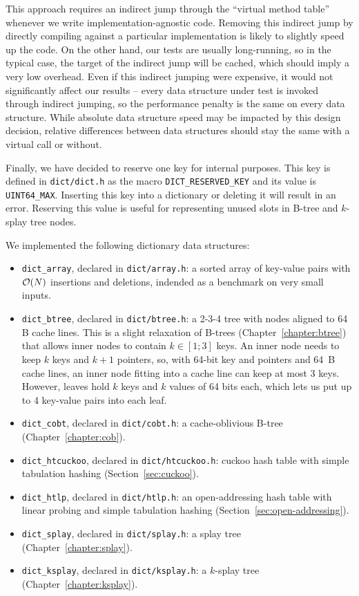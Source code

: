 This approach requires an indirect jump through the ``virtual method table''
whenever we write implementation-agnostic code. Removing this indirect jump
by directly compiling against a particular implementation is likely to slightly
speed up the code. On the other hand, our tests are usually long-running, so in
the typical case, the target of the indirect jump will be cached, which should
imply a very low overhead. Even if this indirect jumping were expensive, it
would not significantly affect our results -- every data structure under test
is invoked through indirect jumping, so the performance penalty is the same
on every data structure. While absolute data structure speed may be impacted
by this design decision, relative differences between data structures should
stay the same with a virtual call or without.

Finally, we have decided to reserve one key for internal purposes.
This key is defined in \texttt{dict/dict.h} as the macro
\texttt{DICT\_RESERVED\_KEY} and its value is \texttt{UINT64\_MAX}.
Inserting this key into a dictionary or deleting it will result in an error.
Reserving this value is useful for representing unused slots in B-tree
and $k$-splay tree nodes.

We implemented the following dictionary data structures:
\begin{itemize}
\item \texttt{dict\_array}, declared in \texttt{dict/array.h}:
	a sorted array of key-value pairs with $\mathcal{O}(N)$ insertions and deletions,
	indended as a benchmark on very small inputs.
\item \texttt{dict\_btree}, declared in \texttt{dict/btree.h}:
	a 2-3-4 tree with nodes aligned to 64 B cache lines.
	This is a slight relaxation of B-trees (Chapter~\ref{chapter:btree})
	that allows inner nodes to contain $k\in[1;3]$ keys.
	An inner node needs to keep $k$ keys and $k+1$ pointers, so, with
	64-bit key and pointers and 64~B cache lines, an inner node fitting
	into a cache line can keep at most 3 keys. However, leaves hold $k$
	keys and $k$ values of 64 bits each, which lets us put up to
	4 key-value pairs into each leaf.
\item \texttt{dict\_cobt}, declared in \texttt{dict/cobt.h}:
	a cache-oblivious B-tree (Chapter~\ref{chapter:cob}).
\item \texttt{dict\_htcuckoo}, declared in \texttt{dict/htcuckoo.h}:
	cuckoo hash table with simple tabulation hashing
	(Section~\ref{sec:cuckoo}).
\item \texttt{dict\_htlp}, declared in \texttt{dict/htlp.h}:
	an open-addressing hash table with linear probing and simple tabulation
	hashing (Section~\ref{sec:open-addressing}).
\item \texttt{dict\_splay}, declared in \texttt{dict/splay.h}:
	a splay tree (Chapter~\ref{chapter:splay}).
\item \texttt{dict\_ksplay}, declared in \texttt{dict/ksplay.h}:
	a $k$-splay tree (Chapter~\ref{chapter:ksplay}). %
\end{itemize}

